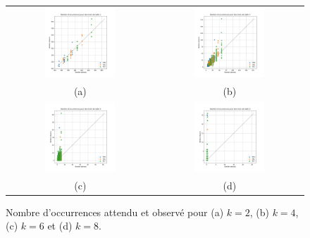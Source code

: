 \documentclass[a4paper,12pt]{article}
\begin{document}
\begin{figure}
\centering
\begin{tabular}{@{} c @{} c @{}}
\includegraphics[width=0.5\textwidth]{Figures/graphe_occurrences_2.png} & \includegraphics[width=0.5\textwidth]{Figures/graphe_occurrences_4.png} \tabularnewline
(a) & (b) \tabularnewline
\includegraphics[width=0.5\textwidth]{Figures/graphe_occurrences_6.png} & \includegraphics[width=0.5\textwidth]{Figures/graphe_occurrences_8.png} \tabularnewline
(c) & (d) \tabularnewline
\end{tabular}
\caption{Nombre d'occurrences attendu et observé pour (a) $k = 2$, (b) $k = 4$, (c) $k = 6$ et (d) $k = 8$.}
\label{FigNbOccurrences}
\end{figure}
\end{document}
